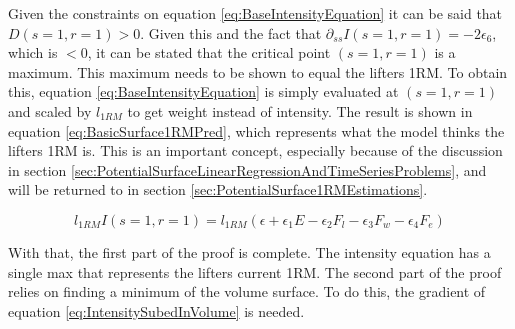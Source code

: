 Given the constraints on equation \ref{eq:BaseIntensityEquation} it can be said that $D(s=1,r=1)>0$. Given this and the fact that $\partial_{ss}I(s=1,r=1)=-2\epsilon_6$, which is $<0$, it can be stated that the critical point $(s=1,r=1)$ is a maximum. This maximum needs to be shown to equal the lifters 1RM. To obtain this, equation \ref{eq:BaseIntensityEquation} is simply evaluated at $(s=1,r=1)$ and scaled by $l_{1RM}$ to get weight instead of intensity. The result is shown in equation \ref{eq:BasicSurface1RMPred}, which represents what the model thinks the lifters 1RM is. This is an important concept, especially because of the discussion in section \ref{sec:PotentialSurfaceLinearRegressionAndTimeSeriesProblems}, and will be returned to in section \ref{sec:PotentialSurface1RMEstimations}.

\begin{equation}
	\label{eq:BasicSurface1RMPred}
	l_{1RM} I(s=1,r=1)=l_{1RM} \left(
		\epsilon+
    		\epsilon_1 E-
    		\epsilon_2 F_l-
    		\epsilon_3 F_w-
    		\epsilon_4 F_e
    	\right)
\end{equation}

With that, the first part of the proof is complete. The intensity equation has a single max that represents the lifters current 1RM. The second part of the proof relies on finding a minimum of the volume surface. To do this, the gradient of equation \ref{eq:IntensitySubedInVolume} is needed.

